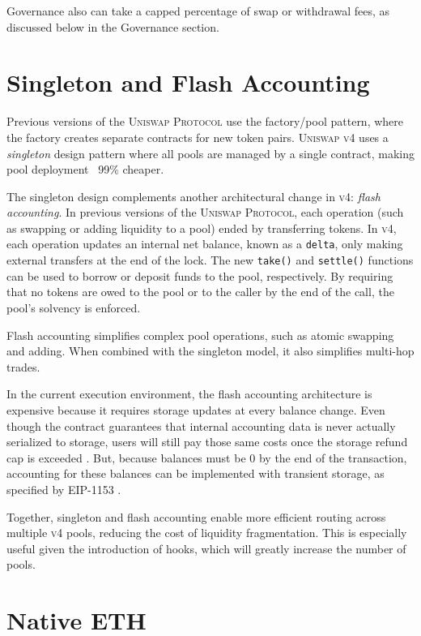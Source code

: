 \documentclass[sigconf,nonacm,prologue,table]{acmart}
\numberwithin{equation}{section}
\theoremstyle{definition}
\theoremstyle{remark}
\begin{document}
Governance also can take a capped percentage of swap or withdrawal fees, as discussed below in the Governance section. 

\section{Singleton and Flash Accounting} \label{flashaccounting}

Previous versions of the \textsc{Uniswap Protocol} use the factory/pool pattern, where the factory creates separate contracts for new token pairs. \textsc{Uniswap v4} uses a \emph{singleton} design pattern where all pools are managed by a single contract, making pool deployment ~99\% cheaper. 

The singleton design complements another architectural change in \textsc{v4}: \emph{flash accounting}. In previous versions of the \textsc{Uniswap Protocol}, each operation (such as swapping or adding liquidity to a pool) ended by transferring tokens. In \textsc{v4}, each operation updates an internal net balance, known as a \verb|delta|, only making external transfers at the end of the lock. The new \verb|take()| and  \verb|settle()| functions can be used to borrow or deposit funds to the pool, respectively. By requiring that no tokens are owed to the pool or to the caller by the end of the call, the pool's solvency is enforced. 

Flash accounting simplifies complex pool operations, such as atomic swapping and adding. When combined with the singleton model, it also simplifies multi-hop trades.

In the current execution environment, the flash accounting architecture is expensive because it requires storage updates at every balance change. Even though the contract guarantees that internal accounting data is never actually serialized to storage, users will still pay those same costs once the storage refund cap is exceeded \cite{Buterin2021}. But, because balances must be 0 by the end of the transaction, accounting for these balances can be implemented with transient storage, as specified by EIP-1153 \cite{Akhunov2018}.

Together, singleton and flash accounting enable more efficient routing across multiple \textsc{v4} pools, reducing the cost of liquidity fragmentation. This is especially useful given the introduction of hooks, which will greatly increase the number of pools. 

\section{Native ETH} 
\label{nativeeth}
\end{document}
